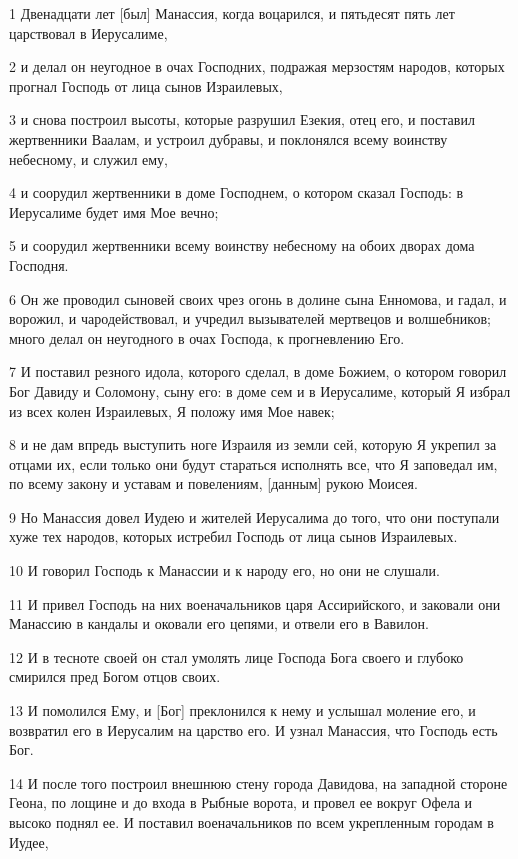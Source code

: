 \par 1 Двенадцати лет [был] Манассия, когда воцарился, и пятьдесят пять лет царствовал в Иерусалиме,
\par 2 и делал он неугодное в очах Господних, подражая мерзостям народов, которых прогнал Господь от лица сынов Израилевых,
\par 3 и снова построил высоты, которые разрушил Езекия, отец его, и поставил жертвенники Ваалам, и устроил дубравы, и поклонялся всему воинству небесному, и служил ему,
\par 4 и соорудил жертвенники в доме Господнем, о котором сказал Господь: в Иерусалиме будет имя Мое вечно;
\par 5 и соорудил жертвенники всему воинству небесному на обоих дворах дома Господня.
\par 6 Он же проводил сыновей своих чрез огонь в долине сына Енномова, и гадал, и ворожил, и чародействовал, и учредил вызывателей мертвецов и волшебников; много делал он неугодного в очах Господа, к прогневлению Его.
\par 7 И поставил резного идола, которого сделал, в доме Божием, о котором говорил Бог Давиду и Соломону, сыну его: в доме сем и в Иерусалиме, который Я избрал из всех колен Израилевых, Я положу имя Мое навек;
\par 8 и не дам впредь выступить ноге Израиля из земли сей, которую Я укрепил за отцами их, если только они будут стараться исполнять все, что Я заповедал им, по всему закону и уставам и повелениям, [данным] рукою Моисея.
\par 9 Но Манассия довел Иудею и жителей Иерусалима до того, что они поступали хуже тех народов, которых истребил Господь от лица сынов Израилевых.
\par 10 И говорил Господь к Манассии и к народу его, но они не слушали.
\par 11 И привел Господь на них военачальников царя Ассирийского, и заковали они Манассию в кандалы и оковали его цепями, и отвели его в Вавилон.
\par 12 И в тесноте своей он стал умолять лице Господа Бога своего и глубоко смирился пред Богом отцов своих.
\par 13 И помолился Ему, и [Бог] преклонился к нему и услышал моление его, и возвратил его в Иерусалим на царство его. И узнал Манассия, что Господь есть Бог.
\par 14 И после того построил внешнюю стену города Давидова, на западной стороне Геона, по лощине и до входа в Рыбные ворота, и провел ее вокруг Офела и высоко поднял ее. И поставил военачальников по всем укрепленным городам в Иудее,
